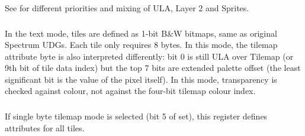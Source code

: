 See  for different priorities and mixing of ULA, Layer 2 and Sprites.


\subsubsection{}

\begin{NextPort}
\end{NextPort}

In the text mode, tiles are defined as 1-bit B\&W bitmaps, same as original Spectrum UDGs. Each tile only requires 8 bytes. In this mode, the tilemap attribute byte is also interpreted differently: bit 0 is still ULA over Tilemap (or 9th bit of tile data index) but the top 7 bits are extended palette offset (the least significant bit is the value of the pixel itself). In this mode, transparency is checked against  colour, not against the four-bit tilemap colour index.


\pagebreak
\subsubsection{}

If single byte tilemap mode is selected (bit 5 of  set), this register defines attributes for all tiles.

\begin{NextPort}
\end{NextPort}


\subsubsection{}

